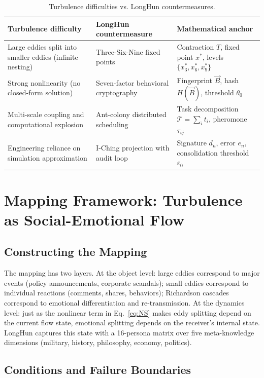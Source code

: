\documentclass[10pt,a4paper]{article}
\theoremstyle{definition}
\begin{document}
\begin{table}[htbp]
\centering
\caption{Turbulence difficulties vs. LongHun countermeasures.}\label{tab:difficulties}
\begin{tabular}{@{}p{2.4cm}p{2.8cm}p{2.4cm}@{}}
\toprule
\textbf{Turbulence difficulty} & \textbf{LongHun countermeasure} & \textbf{Mathematical anchor} \\
\midrule
Large eddies split into smaller eddies (infinite nesting) & Three-Six-Nine fixed points & Contraction $T$, fixed point $x^*$, levels $\{x^*_3,x^*_6,x^*_9\}$ \\
Strong nonlinearity (no closed-form solution) & Seven-factor behavioral cryptography & Fingerprint $\vec{B}$, hash $H(\vec{B})$, threshold $\theta_0$ \\
Multi-scale coupling and computational explosion & Ant-colony distributed scheduling & Task decomposition $\mathcal{T}=\sum_i t_i$, pheromone $\tau_{ij}$ \\
Engineering reliance on simulation approximation & I-Ching projection with audit loop & Signature $d_n$, error $e_n$, consolidation threshold $\varepsilon_0$ \\
\bottomrule
\end{tabular}
\end{table}

\section{Mapping Framework: Turbulence as Social-Emotional Flow}\label{sec:mapping}

\subsection{Constructing the Mapping}

The mapping has two layers. At the object level: large eddies correspond to major events (policy announcements, corporate scandals); small eddies correspond to individual reactions (comments, shares, behaviors); Richardson cascades correspond to emotional differentiation and re-transmission. At the dynamics level: just as the nonlinear term in Eq.~\eqref{eq:NS} makes eddy splitting depend on the current flow state, emotional splitting depends on the receiver's internal state. LongHun captures this state with a 16-persona matrix over five meta-knowledge dimensions (military, history, philosophy, economy, politics).

\subsection{Conditions and Failure Boundaries}
\end{document}
